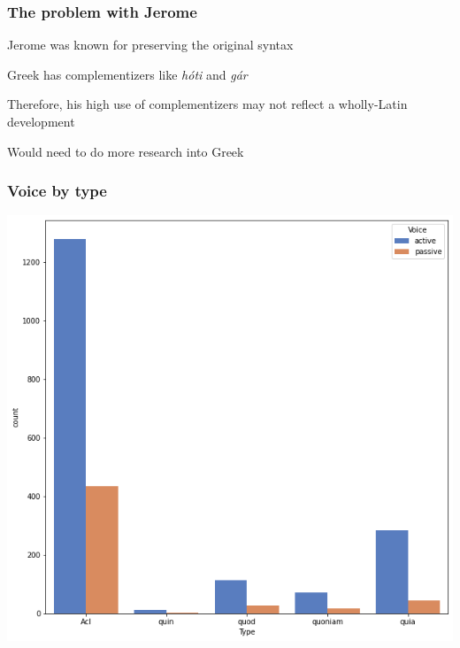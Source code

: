 \documentclass{beamer}
\begin{document}
\begin{frame}
\frametitle{The problem with Jerome}
Jerome was known for preserving the original syntax

Greek has complementizers like \textit{h\'oti} and \textit{g\'ar}

Therefore, his high use of complementizers may not reflect a wholly-Latin development

Would need to do more research into Greek
\end{frame}

\begin{frame}
\frametitle{Voice by type}
\begin{center}
    \includegraphics[width=\textwidth,height=0.8\textheight,keepaspectratio]{graphs/voice_by_type.png}
\end{center}
\end{frame}
\end{document}
